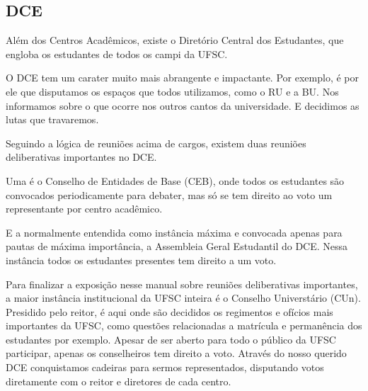 \subsection{DCE}
Além dos Centros Acadêmicos, existe o Diretório Central dos Estudantes, que engloba os estudantes de todos os campi da UFSC.

O DCE tem um carater muito mais abrangente e impactante.
Por exemplo, é por ele que disputamos os espaços que todos utilizamos, como o RU e a BU.
Nos informamos sobre o que ocorre nos outros cantos da universidade.
E decidimos as lutas que travaremos.

Seguindo a lógica de reuniões acima de cargos, existem duas reuniões deliberativas importantes no DCE.

Uma é o Conselho de Entidades de Base (CEB), onde todos os estudantes são convocados periodicamente para debater, mas só se tem direito ao voto um representante por centro acadêmico.

E a normalmente entendida como instância máxima e convocada apenas para pautas de máxima importância, a Assembleia Geral Estudantil do DCE.
Nessa instância todos os estudantes presentes tem direito a um voto.

Para finalizar a exposição nesse manual sobre reuniões deliberativas importantes, a maior instância institucional da UFSC inteira é o Conselho Universtário (CUn).
Presidido pelo reitor, é aqui onde são decididos os regimentos e ofícios mais importantes da UFSC,
como questões relacionadas a matrícula e permanência dos estudantes por exemplo.
Apesar de ser aberto para todo o público da UFSC participar, apenas os conselheiros tem direito a voto.
Através do nosso querido DCE conquistamos cadeiras para sermos representados, disputando votos diretamente com o reitor e diretores de cada centro.
